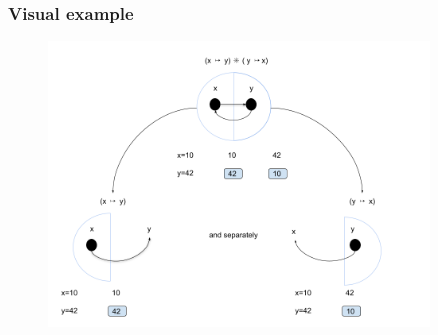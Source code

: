 \documentclass{beamer}
\begin{document}
    \begin{frame}
        \frametitle{Visual example}
        \begin{figure}
        \includegraphics[width=0.9\textwidth]{img/ex1.png}
        \end{figure}
       

    \end{frame}
\end{document}
